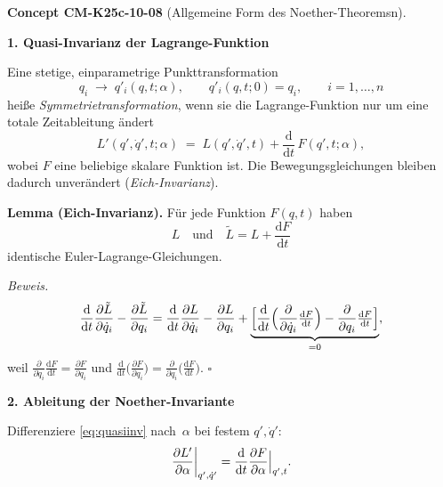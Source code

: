 \documentclass[10pt, letterpaper]{article}
\newcommand{\CustomHeading}[3]{%
  \par\medskip\noindent%
  \textbf{#1 #2} \textnormal{(#3)}.\enskip%
}
\newenvironment{CONC}[2]{\CustomHeading{Concept}{#1}{#2}}{}
\begin{document}
\begin{CONC}{CM-K25c-10-08}{Allgemeine Form des Noether-Theoremsn}
\textbf{1. Quasi-Invarianz der Lagrange-Funktion}

Eine stetige, einparametrige Punkttransformation
\[
  q_i \;\longrightarrow\; q'_i(q,t;\alpha),
  \qquad
  q'_i(q,t;0)=q_i,
  \qquad i=1,\dots,n
\]
heiße \emph{Symmetrietransformation}, wenn sie die Lagrange-Funktion nur
um eine totale Zeitableitung ändert
\begin{equation}
  L'(q',\dot q',t;\alpha)
  \;=\;
  L(q',\dot q',t)
  +\frac{\mathrm d}{\mathrm dt}\,F(q',t;\alpha) ,
  \label{eq:quasiinv}
\end{equation}
wobei \(F\) eine beliebige skalare Funktion ist.  
Die Bewegungsgleichungen bleiben dadurch unverändert
(\emph{Eich-Invarianz}).  

\textbf{Lemma (Eich-Invarianz).}  
Für jede Funktion \(F(q,t)\) haben
\[
  L \quad\text{und}\quad 
  \tilde L=L+\frac{\mathrm dF}{\mathrm dt}
\]
identische Euler-Lagrange-Gleichungen.

\emph{Beweis.}
\[
  \frac{\mathrm d}{\mathrm dt}\frac{\partial\tilde L}{\partial\dot q_i}
 -\frac{\partial\tilde L}{\partial q_i}
 =
 \frac{\mathrm d}{\mathrm dt}\frac{\partial L}{\partial\dot q_i}
 -\frac{\partial L}{\partial q_i}
 +\underbrace{\Bigl[
   \frac{\mathrm d}{\mathrm dt}
     \Bigl(\frac{\partial}{\partial\dot q_i}\tfrac{\mathrm dF}{\mathrm dt}\Bigr)
  -\frac{\partial}{\partial q_i}\tfrac{\mathrm dF}{\mathrm dt}
 \Bigr]}_{=0},
\]
weil
\(
 \frac{\partial}{\partial\dot q_i}\tfrac{\mathrm dF}{\mathrm dt}
 =\frac{\partial F}{\partial q_i}
\)
und 
\(
 \frac{\mathrm d}{\mathrm dt}\!\bigl(\tfrac{\partial F}{\partial q_i}\bigr)
 =\frac{\partial}{\partial q_i}\!\bigl(\tfrac{\mathrm dF}{\mathrm dt}\bigr).
\)
\hfill\(\square\)

\textbf{2. Ableitung der Noether-Invariante}

Differenziere \eqref{eq:quasiinv} nach~\(\alpha\) bei festem
\(q',\dot q'\):
\begin{equation}
  \left.
    \frac{\partial L'}{\partial\alpha}
  \right|_{q',\dot q'}
  =
  \frac{\mathrm d}{\mathrm dt}
  \Bigl.
    \frac{\partial F}{\partial\alpha}
  \Bigr|_{q',t}.
  \label{eq:alphaF}
\end{equation}


\end{CONC}
\end{document}
